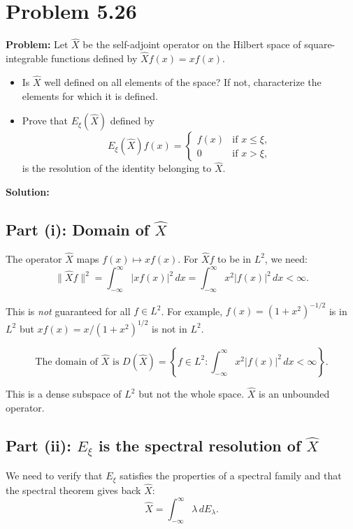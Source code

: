 \documentclass[12pt]{article}
\begin{document}
\section*{Problem 5.26}

\textbf{Problem:} Let $\hat{X}$ be the self-adjoint operator on the Hilbert space of square-integrable functions defined by $\hat{X}f(x) = xf(x)$.
\begin{itemize}
\item[(i)] Is $\hat{X}$ well defined on all elements of the space? If not, characterize the elements for which it is defined.
\item[(ii)] Prove that $E_\xi(\hat{X})$ defined by
\[
E_\xi(\hat{X})f(x) = \begin{cases} f(x) & \text{if } x \leq \xi, \\ 0 & \text{if } x > \xi, \end{cases}
\]
is the resolution of the identity belonging to $\hat{X}$.
\end{itemize}

\bigskip
\textbf{Solution:}

\subsection*{Part (i): Domain of $\hat{X}$}

The operator $\hat{X}$ maps $f(x) \mapsto xf(x)$. For $\hat{X}f$ to be in $L^2$, we need:
\[
\|\hat{X}f\|^2 = \int_{-\infty}^{\infty}|xf(x)|^2\,dx = \int_{-\infty}^{\infty}x^2|f(x)|^2\,dx < \infty.
\]

This is \emph{not} guaranteed for all $f \in L^2$. For example, $f(x) = (1+x^2)^{-1/2}$ is in $L^2$ but $xf(x) = x/(1+x^2)^{1/2}$ is not in $L^2$.

\[
\boxed{\text{The domain of } \hat{X} \text{ is } D(\hat{X}) = \left\{f \in L^2 : \int_{-\infty}^{\infty}x^2|f(x)|^2\,dx < \infty\right\}.}
\]

This is a dense subspace of $L^2$ but not the whole space. $\hat{X}$ is an unbounded operator.

\subsection*{Part (ii): $E_\xi$ is the spectral resolution of $\hat{X}$}

We need to verify that $E_\xi$ satisfies the properties of a spectral family and that the spectral theorem gives back $\hat{X}$:
\[
\hat{X} = \int_{-\infty}^{\infty}\lambda\,dE_\lambda.
\]
\end{document}

